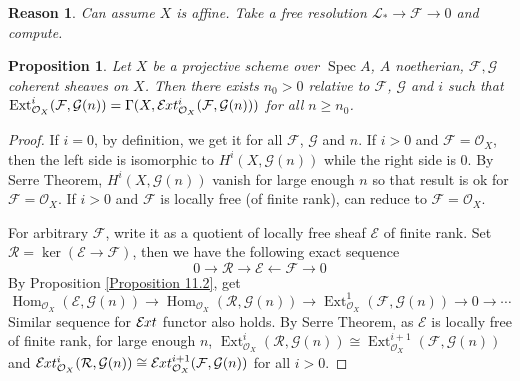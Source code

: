 \documentclass{ctexart}
\newtheorem{proposition}{Proposition}[section]
\newtheorem{reason}{Reason}[section]
\renewcommand{\hom}{\operatorname{Hom}}
\newcommand{\ext}{\operatorname{Ext}}
\newcommand{\sheafext}{\mathcal{E}\kern -.5pt xt}
\newcommand{\spec}{\operatorname{Spec}}
\begin{document}
\begin{reason}
    Can assume $X$ is affine.
    Take a free resolution $\mathcal{L}_{\ast} \longrightarrow \mathcal{F} \longrightarrow 0$ and compute.
\end{reason}
\begin{proposition}
    Let $X$ be a projective scheme over $\spec A$, $A$ noetherian, $\mathcal{F}, \mathcal{G}$ coherent sheaves on $X$.
    Then there exists $n_{0} > 0$ relative to $\mathcal{F}$, $\mathcal{G}$ and $i$ such that $\ext_{\mathcal{O}_{X}}^{i}(\mathcal{F}, \mathcal{G}(n)) = \Gamma(X, \sheafext_{\mathcal{O}_{X}}^{i}(\mathcal{F}, \mathcal{G}(n)))$ for all $n \ge n_{0}$.
    \label{Proposition 11.7}
\end{proposition}
\begin{proof}
    If $i = 0$, by definition, we get it for all $\mathcal{F}$, $\mathcal{G}$ and $n$.
    If $i > 0$ and $\mathcal{F} = \mathcal{O}_{X}$, then the left side is isomorphic to $H^{i}(X, \mathcal{G}(n))$ while the right side is $0$.
    By Serre Theorem, $H^{i}(X, \mathcal{G}(n))$ vanish for large enough $n$ so that result is ok for $\mathcal{F} = \mathcal{O}_{X}$.
    If $i > 0$ and $\mathcal{F}$ is locally free (of finite rank), can reduce to $\mathcal{F} = \mathcal{O}_{X}$.
    \par
    For arbitrary $\mathcal{F}$, write it as a quotient of locally free sheaf $\mathcal{E}$ of finite rank.
    Set $\mathcal{R} = \ker(\mathcal{E} \rightarrow \mathcal{F})$, then we have the following exact sequence
    \begin{equation*}
        0 \longrightarrow \mathcal{R} \longrightarrow \mathcal{E} \longleftarrow \mathcal{F} \longrightarrow 0
    \end{equation*}
    By Proposition \ref{Proposition 11.2}, get
    \begin{equation*}
        \hom_{\mathcal{O}_{X}}(\mathcal{E}, \mathcal{G}(n)) \longrightarrow \hom_{\mathcal{O}_{X}}(\mathcal{R}, \mathcal{G}(n)) \longrightarrow \ext_{\mathcal{O}_{X}}^{1}(\mathcal{F}, \mathcal{G}(n)) \longrightarrow 0 \longrightarrow \cdots
    \end{equation*}
    Similar sequence for $\sheafext$ functor also holds.
    By Serre Theorem, as $\mathcal{E}$ is locally free of finite rank, for large enough $n$, $\ext_{\mathcal{O}_{X}}^{i}(\mathcal{R}, \mathcal{G}(n)) \cong \ext_{\mathcal{O}_{X}}^{i + 1}(\mathcal{F}, \mathcal{G}(n))$ and $\sheafext_{\mathcal{O}_{X}}^{i}(\mathcal{R}, \mathcal{G}(n)) \cong \sheafext_{\mathcal{O}_{X}}^{i + 1}(\mathcal{F}, \mathcal{G}(n))$ for all $i > 0$.

\end{proof}
\end{document}
